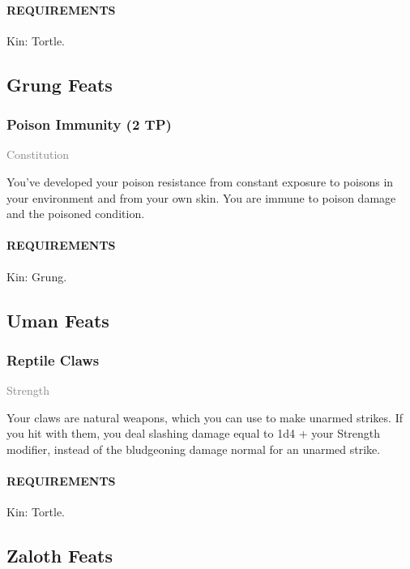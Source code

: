     \paragraph{REQUIREMENTS} Kin: Tortle.

\subsection*{Grung Feats}
    \subsubsection{Poison Immunity (2 TP)} \label{feat::poisonimmunity}
    \small{\textcolor{gray}{Constitution}}

    \normalsize
    You've developed your poison resistance from constant exposure to poisons in your environment and from your own skin.
    You are immune to poison damage and the poisoned condition.
    \paragraph{REQUIREMENTS} Kin: Grung.

\subsection*{Uman Feats}
    \subsubsection{Reptile Claws} \label{feat::reptileclaws}
    \small{\textcolor{gray}{Strength}}

    \normalsize
    Your claws are natural weapons, which you can use to make unarmed strikes.
    If you hit with them, you deal slashing damage equal to 1d4 + your Strength modifier, instead of the bludgeoning damage normal for an unarmed strike.
    \paragraph{REQUIREMENTS} Kin: Tortle.

\subsection*{Zaloth Feats}

